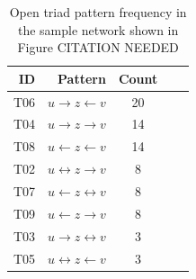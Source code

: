 \begin{table}[t]
\caption{Open triad pattern frequency in the sample network shown in Figure CITATION NEEDED}
\label{sample_network_freq}
\vskip 0.15in
\begin{center}
\begin{small}
\begin{sc}
\begin{tabular}{rrccr}
\hline
ID & Pattern & Count \\
\hline
T06 & $u \rightarrow z \leftarrow v $ & 20 \\
T04 &$ u \rightarrow z \rightarrow v$ & 14 \\
T08 & $u \leftarrow z \leftarrow v$ & 14 \\
T02 & $u \leftrightarrow z \rightarrow v$ & 8 \\
T07 & $u \leftarrow z \leftrightarrow v$ & 8 \\
T09 & $u \leftarrow z \rightarrow v$ & 8 \\
T03 & $u \rightarrow z \leftrightarrow v$ & 3 \\
T05 & $u \leftrightarrow z \leftarrow v$ & 3 \\

\hline
\end{tabular}
\end{sc}
\end{small}
\end{center}
\vskip -0.1in
\end{table}

